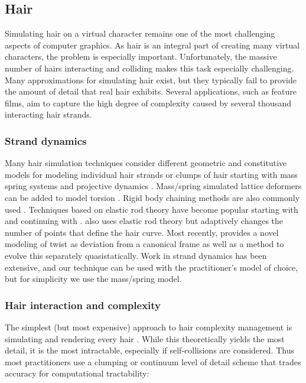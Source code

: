 	\subsection{Hair}
	
Simulating hair on a virtual character remains one of the most
challenging aspects of computer graphics. As hair is an integral
part of creating many virtual characters, the problem is especially important.
Unfortunately, the massive number of hairs interacting and colliding
makes this task especially challenging. Many approximations for
simulating hair exist, but they typically fail to provide the amount of
detail that real hair exhibits. Several applications, such as feature
films, aim to capture the high degree of complexity caused by several 
thousand interacting hair strands.

		\subsubsection{Strand dynamics}
		Many hair simulation techniques consider different geometric and constitutive models
for modeling individual hair strands or clumps of hair starting with
mass spring systems \cite{rosenblum:1991:hair} and projective dynamics
\cite{anjyo:1992:hair}.  Mass/spring simulated lattice deformers can
be added to model torsion
\cite{plante:2002:hair-complexity,selle:2008:hair}.
Rigid body chaining methods are also commonly used
\cite{brown:2004:real-time-knot,choe:2005:simulating-complex-hair,hadap:2006:orientedstrands}.
Techniques based on elastic rod theory have become popular
starting with \cite{pai:2002:strands} and continuing with
\cite{gregoire:2006:interactive-simulation-one-dimensional,bertails:2006:superhelices}.
\cite{spillmann:2007:corde} also uses elastic rod theory but
adaptively changes the number of points that define the hair curve.
Most recently, \cite{bergou:2008:elastic-rods} provides a novel
modeling of twist as deviation from a canonical frame as well as a
method to evolve this separately quasistatically. Work in strand
dynamics has been extensive, and our technique can be used with the
practitioner's model of choice, but for simplicity we use
the mass/spring model.

		\subsubsection{Hair interaction and complexity}
		
The simplest (but most expensive) approach to hair complexity
management is simulating and rendering every hair
\cite{rosenblum:1991:hair,anjyo:1992:hair,selle:2008:hair}. While this
theoretically yields the most detail, it is the most intractable,
especially if self-collisions are considered.  Thus most practitioners
use a clumping or continuum level of detail scheme that trades
accuracy for computational tractability:

